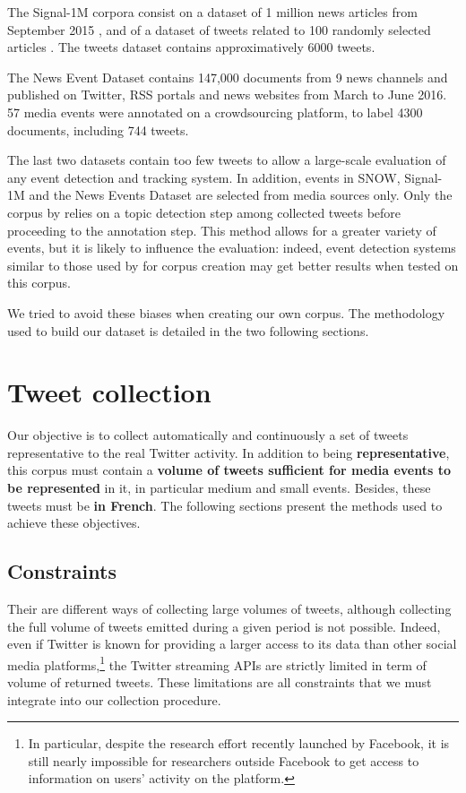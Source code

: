 The Signal-1M corpora consist on a dataset of 1 million news articles from September 2015 \citep{corney2016million}, and of a dataset of tweets related to 100 randomly selected articles \citep{suarez2018data}. The tweets dataset contains approximatively 6000 tweets.

The News Event Dataset \citep{mele2019multi} contains 147,000 documents from 9 news channels and published on Twitter, RSS portals and news websites from March to June 2016. 57 media events were annotated on a crowdsourcing platform, to label 4300 documents, including 744 tweets.

The last two datasets contain too few tweets to allow a large-scale evaluation of any event detection and tracking system. In addition, events in SNOW, Signal-1M and the News Events Dataset are selected from media sources only. Only the corpus by \citet{mcminn_building_2013} relies on a topic detection step among collected tweets before proceeding to the annotation step. This method allows for a greater variety of events, but it is likely to influence the evaluation: indeed, event detection systems similar to those used by \citet{mcminn_building_2013} for corpus creation may get better results when tested on this corpus.

We tried to avoid these biases when creating our own corpus. The methodology used to build our dataset is detailed in the two following sections.

\section{Tweet collection}
\label{Tweet collection}
Our objective is to collect automatically and continuously a set of tweets representative to the real Twitter activity. In addition to being \textbf{representative}, this corpus must contain a \textbf{volume of tweets sufficient for media events to be represented} in it, in particular medium and small events. Besides, these tweets must be \textbf{in French}. The following sections present the methods used to achieve these objectives.
\subsection{Constraints}
Their are different ways of collecting large volumes of tweets, although collecting the full volume of tweets emitted during a given period is not possible. Indeed, even if Twitter is known for providing a larger access to its data than other social media platforms,\footnote{In particular, despite the research effort recently launched by Facebook, it is still nearly impossible for researchers outside Facebook to get access to information on users' activity on the platform.} the Twitter streaming APIs are strictly limited in term of volume of returned tweets. These limitations are all constraints that we must integrate into our collection procedure.
	
